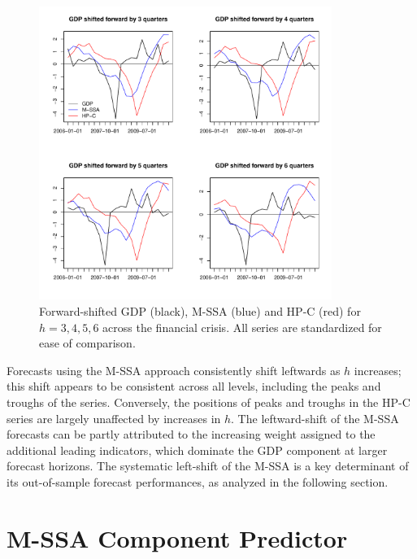 \documentclass[11pt,a4paper]{article}
\begin{document}
\begin{figure}[H]
    \begin{center}
        \includegraphics[width=0.85\textwidth]{./Figures/mssa_hpc_financial_crisis.pdf}
        \caption{Forward-shifted GDP (black), M-SSA (blue) and HP-C (red) for $h=3,4,5,6$ across the financial crisis. All series are standardized for ease of comparison.
        \label{mssa_hpc_financial_crisis}}
    \end{center}
\end{figure}



Forecasts using the M-SSA approach consistently shift leftwards as $h$ increases; this shift appears to be consistent across all levels, including the peaks and troughs of the series. Conversely, the positions of peaks and troughs in the HP-C series are largely unaffected by increases in $h$. The leftward-shift of  the M-SSA forecasts can be partly attributed to the increasing weight assigned to the additional leading indicators, which dominate the GDP component at larger forecast horizons. %
The systematic left-shift of the M-SSA is a key determinant of its out-of-sample forecast performances, as analyzed in the following section. 


\section{M-SSA Component Predictor}\label{sec:mSSA_component}
\end{document}
